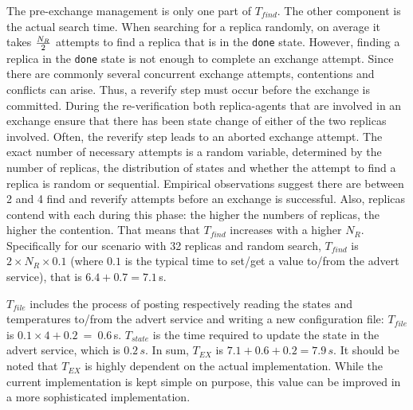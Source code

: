 \documentclass{rspublic}
\newcommand{\alnote}[1]{ {\textcolor{blue} { ***andre: #1 }}}
\newcommand{\alnote}[1]{}
\begin{document}
The pre-exchange management is only one part of $T_{find}$. The other 
component is the actual search time. When searching for a replica randomly,
on average it takes $N_R \over 2$ attempts to find a replica that is
in the \texttt{done} state.  However, finding a replica in the
\texttt{done} state is not enough to complete an exchange attempt.
Since there are commonly several concurrent exchange attempts,
contentions and conflicts can arise. Thus, a reverify step must occur before
the exchange is committed. During the re-verification both replica-agents
that are involved in an exchange ensure that there has been state change 
of either of the two replicas involved.  Often, the reverify step leads 
to an aborted exchange attempt. The exact number of necessary attempts is a
random variable, determined by the number of replicas, the
distribution of states and whether the attempt to find a replica is
random or sequential. Empirical observations suggest there are between 2 and 4
find and reverify attempts before an exchange is successful.  
Also, replicas contend with each during this phase: the higher the numbers of replicas,
the higher the contention. That means that $T_{find}$ increases with a higher $N_R$. 
Specifically for our scenario with 32 replicas and random search, $T_{find}$ is 
$2 \times N_R \times 0.1$ (where $0.1$ is the typical time to set/get a value 
to/from the advert service), that is $6.4+0.7=7.1$\,s.

$T_{file}$ includes the process of posting respectively reading the states 
and temperatures to/from the advert service and writing a new configuration 
file: $T_{file}$ is $0.1\times 4 +0.2~=~0.6$\,s. %
$T_{state}$ is the time required to update the state in the advert
service, which is $0.2\,s$.  In sum, $T_{EX}$ is $7.1+0.6 +0.2=
7.9\,s$.  It should be noted that $T_{EX}$ is highly dependent on
the actual implementation. While the current implementation is kept
simple on purpose, this value can be improved in a more sophisticated 
implementation.
\end{document}
